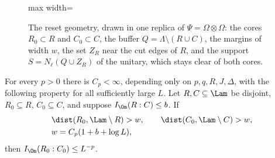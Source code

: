 \begin{figure}[t]
\centering
\begin{adjustbox}{max width=\linewidth}

\end{adjustbox}
\caption{The reset geometry, drawn in one replica of $\Psi=\Omega\otimes\Omega$: the cores $R_0\subset R$ and $C_0\subset C$, the buffer $Q=\Lambda\setminus(R\cup C)$, the margins of width $w$, the set $Z_R$ near the cut edges of $R$, and the support $S=N_\ell(Q\cup Z_R)$ of the unitary, which stays clear of both cores.}\label{fig:chain-reset}
\end{figure}

\begin{lemma}\label{lem:reset}
For every $p>0$ there is $C_p<\infty$, depending only on $p,q,R,J,\Delta$,
with the following property for all sufficiently large $L$. Let
$R,C\subseteq\Lam$ be disjoint, $R_0\subseteq R$, $C_0\subseteq C$, and
suppose $I_\Om(R:C)\le b$. If
\[
\begin{split}
 &\dist(R_0,\Lam\setminus R)>w,\qquad \dist(C_0,\Lam\setminus C)>w,\\
 &w=C_p(1+b+\log L),
\end{split}
\]
then $I_\Om(R_0:C_0)\le L^{-p}$.
\end{lemma}
